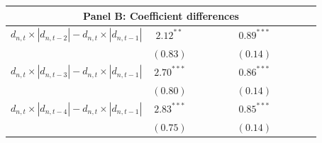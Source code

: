 \begin{tabular}{lcccccccccc}
   \hline \multicolumn{11}{c}{Panel B: Coefficient differences} \\
 \hline$d_{n,t} \times |d_{n,t-2}| - d_{n,t} \times |d_{n,t-1}|$ & $2.12^{**}$ &  &  &  &  & $0.89^{***}$ &  &  &  &  \\ 
   & $(0.83)$ &  &  &  &  & $(0.14)$ &  &  &  &  \\ 
  $d_{n,t} \times |d_{n,t-3}| - d_{n,t} \times |d_{n,t-1}|$ & $2.70^{***}$ &  &  &  &  & $0.86^{***}$ &  &  &  &  \\ 
   & $(0.80)$ &  &  &  &  & $(0.14)$ &  &  &  &  \\ 
  $d_{n,t} \times |d_{n,t-4}| - d_{n,t} \times |d_{n,t-1}|$ & $2.83^{***}$ &  &  &  &  & $0.85^{***}$ &  &  &  &  \\ 
   & $(0.75)$ &  &  &  &  & $(0.14)$ &  &  &  &  \\ 
   \bottomrule 
\end{tabular}
